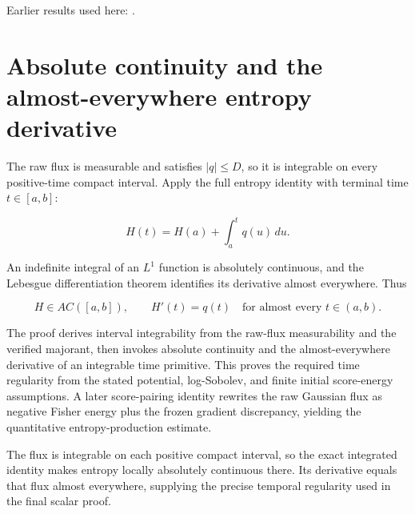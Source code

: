 \documentclass[11pt,a4paper]{article}
\begin{document}
Earlier results used here: \cite[Section~3.26.3]{LangevinLean2026ULASC}.

\section{\texorpdfstring{Absolute continuity and the almost-everywhere entropy derivative}{Absolute continuity and the almost-everywhere entropy derivative}}


The raw flux is measurable and satisfies \(|q|\le D\), so it is integrable on every positive-time compact interval. Apply the full entropy identity with terminal time \(t\in[a,b]\):

\[H(t)=H(a)+\int_a^t q(u)\,du.\]

An indefinite integral of an \(L^1\) function is absolutely continuous, and the Lebesgue differentiation theorem identifies its derivative almost everywhere. Thus

\[H\in AC([a,b]),\qquad H'(t)=q(t)\quad\text{for almost every }t\in(a,b).\]

The proof derives interval integrability from the raw-flux measurability and the verified majorant, then invokes absolute continuity and the almost-everywhere derivative of an integrable time primitive. This proves the required time regularity from the stated potential, log-Sobolev, and finite initial score-energy assumptions. A later score-pairing identity rewrites the raw Gaussian flux as negative Fisher energy plus the frozen gradient discrepancy, yielding the quantitative entropy-production estimate.



The flux is integrable on each positive compact interval, so the exact integrated identity makes entropy locally absolutely continuous there. Its derivative equals that flux almost everywhere, supplying the precise temporal regularity used in the final scalar proof.
\end{document}
